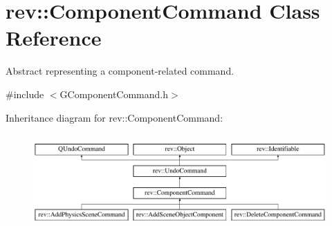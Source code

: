\hypertarget{classrev_1_1_component_command}{}\section{rev\+::Component\+Command Class Reference}
\label{classrev_1_1_component_command}


Abstract representing a component-\/related command.  




{\ttfamily \#include $<$G\+Component\+Command.\+h$>$}

Inheritance diagram for rev\+::Component\+Command\+:\begin{figure}[H]
\begin{center}
\leavevmode
\includegraphics[height=3.660131cm]{classrev_1_1_component_command}
\end{center}
\end{figure}
